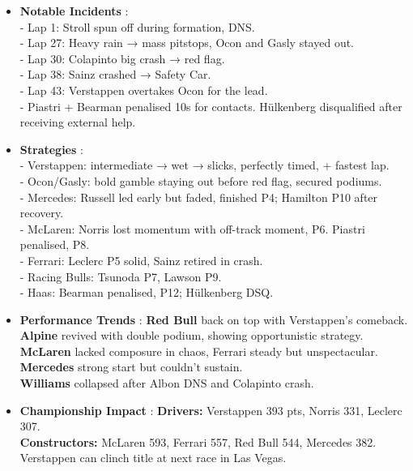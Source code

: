 \begin{itemize}
    \item \textbf{Notable Incidents} : \\
    - Lap 1: Stroll spun off during formation, DNS. \\
    - Lap 27: Heavy rain → mass pitstops, Ocon and Gasly stayed out. \\
    - Lap 30: Colapinto big crash → red flag. \\
    - Lap 38: Sainz crashed → Safety Car. \\
    - Lap 43: Verstappen overtakes Ocon for the lead. \\
    - Piastri + Bearman penalised 10s for contacts. Hülkenberg disqualified after receiving external help.
    
    \item \textbf{Strategies} : \\
    - Verstappen: intermediate → wet → slicks, perfectly timed, + fastest lap. \\
    - Ocon/Gasly: bold gamble staying out before red flag, secured podiums. \\
    - Mercedes: Russell led early but faded, finished P4; Hamilton P10 after recovery. \\
    - McLaren: Norris lost momentum with off-track moment, P6. Piastri penalised, P8. \\
    - Ferrari: Leclerc P5 solid, Sainz retired in crash. \\
    - Racing Bulls: Tsunoda P7, Lawson P9. \\
    - Haas: Bearman penalised, P12; Hülkenberg DSQ.
    
    \item \textbf{Performance Trends} : \textbf{Red Bull} back on top with Verstappen’s comeback. \\
    \textbf{Alpine} revived with double podium, showing opportunistic strategy. \\
    \textbf{McLaren} lacked composure in chaos, Ferrari steady but unspectacular. \\
    \textbf{Mercedes} strong start but couldn’t sustain. \\
    \textbf{Williams} collapsed after Albon DNS and Colapinto crash. 
    
    \item \textbf{Championship Impact} : \textbf{Drivers:} Verstappen 393 pts, Norris 331, Leclerc 307. \\
    \textbf{Constructors:} McLaren 593, Ferrari 557, Red Bull 544, Mercedes 382. \\
    Verstappen can clinch title at next race in Las Vegas.
\end{itemize}

